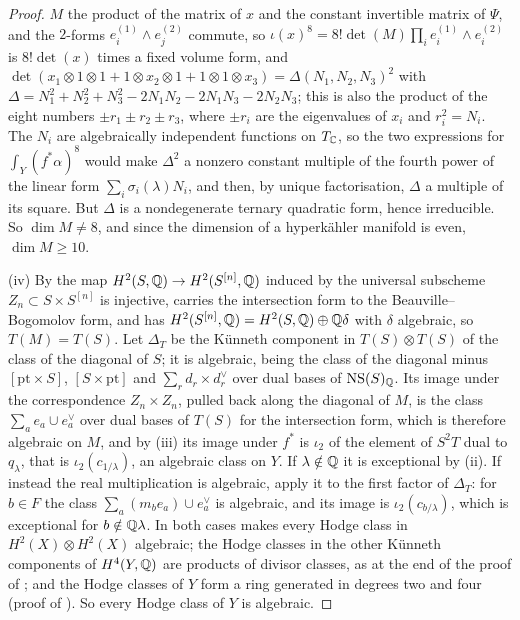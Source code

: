 \begin{proof}
$M$ the product of the matrix of $x$ and the constant invertible matrix of
$\Psi$, and the $2$-forms $e_{i}^{(1)}\wedge e_{j}^{(2)}$ commute, so
$\iota(x)^{8}=8!\det(M)\prod_{i}e_{i}^{(1)}\wedge e_{i}^{(2)}$ is $8!\det(x)$
times a fixed volume form, and
$\det(x_{1}\otimes1\otimes1+1\otimes x_{2}\otimes1+1\otimes1\otimes
x_{3})=\Delta(N_{1},N_{2},N_{3})^{2}$ with
$\Delta=N_{1}^{2}+N_{2}^{2}+N_{3}^{2}-2N_{1}N_{2}-2N_{1}N_{3}-2N_{2}N_{3}$;
this is also the product of the eight numbers $\pm r_{1}\pm r_{2}\pm r_{3}$,
where $\pm r_{i}$ are the eigenvalues of $x_{i}$ and $r_{i}^{2}=N_{i}$. The
$N_{i}$ are algebraically independent functions on $T_{\mathbb{C}}$, so the two
expressions for $\int_{Y}(f^{*}\alpha)^{8}$ would make $\Delta^{2}$ a nonzero
constant multiple of the fourth power of the linear form
$\sum_{i}\sigma_{i}(\lambda)N_{i}$, and then, by unique factorisation,
$\Delta$ a multiple of its square. But $\Delta$ is a nondegenerate
ternary quadratic form, hence irreducible. So $\dim M\ne8$, and since the
dimension of a hyperk\"ahler manifold is even, $\dim M\ge10$.

(iv) By \cite{Bea83} the map $H^{2}(S,\mathbb{Q})\to H^{2}(S^{[n]},\mathbb{Q})$ induced by
the universal subscheme $Z_{n}\subset S\times S^{[n]}$ is injective, carries
the intersection form to the Beauville--Bogomolov form, and has
$H^{2}(S^{[n]},\mathbb{Q})=H^{2}(S,\mathbb{Q})\oplus\mathbb{Q}\delta$ with $\delta$ algebraic, so
$T(M)=T(S)$. Let $\Delta_{T}$ be the K\"unneth component in $T(S)\otimes
T(S)$ of the class of the diagonal of $S$; it is algebraic, being the class
of the diagonal minus $[\mathrm{pt}\times S]$, $[S\times\mathrm{pt}]$ and
$\sum_{r}d_{r}\times d_{r}^{\vee}$ over dual bases of $\mathrm{NS}(S)_{\mathbb{Q}}$. Its image
under the correspondence $Z_{n}\times Z_{n}$, pulled back along the diagonal
of $M$, is the class $\sum_{a}e_{a}\cup e_{a}^{\vee}$ over dual bases of
$T(S)$ for the intersection form, which is therefore algebraic on $M$, and by
(iii) its image under $f^{*}$ is $\iota_{2}$ of the element of $S^{2}T$ dual
to $q_{\lambda}$, that is $\iota_{2}(c_{1/\lambda})$, an algebraic class on
$Y$. If $\lambda\notin\mathbb{Q}$ it is exceptional by (ii). If instead the real
multiplication is algebraic, apply it to the first factor of $\Delta_{T}$:
for $b\in F$ the class $\sum_{a}(m_{b}e_{a})\cup e_{a}^{\vee}$ is algebraic,
and its image is $\iota_{2}(c_{b/\lambda})$, which is exceptional for
$b\notin\mathbb{Q}\lambda$. In both cases  makes every
Hodge class in $H^{2}(X)\otimes H^{2}(X)$ algebraic; the Hodge classes in the
other K\"unneth components of $H^{4}(Y,\mathbb{Q})$ are products of divisor classes,
as at the end of the proof of ; and the Hodge classes of
$Y$ form a ring generated in degrees two and four (proof of
). So every Hodge class of $Y$ is algebraic.
\end{proof}

